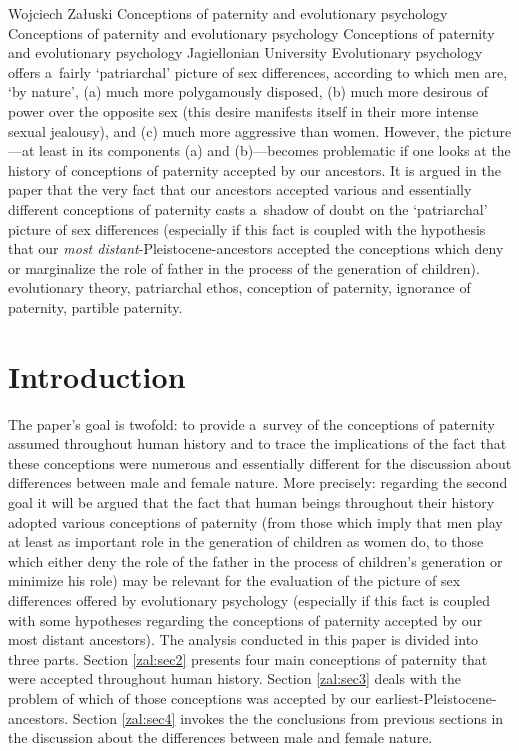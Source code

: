 \begin{artengenv}{Wojciech Załuski}
	{Conceptions of paternity and evolutionary psychology}
	{Conceptions of paternity and evolutionary psychology}
	{Conceptions of paternity and evolutionary psychology}
	{Jagiellonian University}
	{Evolutionary psychology offers a~fairly ‘patriarchal' picture of sex differences, according to which men are, ‘by nature', (a) much more polygamously disposed, (b) much more desirous of power over the opposite sex (this desire manifests itself in their more intense sexual jealousy), and (c) much more aggressive than women. However, the picture---at least in its components (a) and (b)---becomes problematic if one looks at the history of conceptions of paternity accepted by our ancestors. It is argued in the paper that the very fact that our ancestors accepted various and essentially different conceptions of paternity casts a~shadow of doubt on the ‘patriarchal' picture of sex differences (especially if this fact is coupled with the hypothesis that our \textit{most distant}-Pleistocene-ancestors accepted the conceptions which deny or marginalize the role of father in the process of the generation of children).}
	{evolutionary theory, patriarchal ethos, conception of paternity, ignorance of paternity, partible paternity.}




\section{Introduction}
\lettrine[loversize=0.13,lines=2,lraise=-0.01,nindent=0em,findent=0.2pt]%
{T}{}he paper's goal is twofold: to provide a~survey of the conceptions of paternity assumed throughout human history and to trace the implications of the fact that these conceptions were numerous and essentially different for the discussion about differences between male and female nature. More precisely: regarding the second goal it will be argued that the fact that human beings throughout their history adopted various conceptions of paternity (from those which imply that men play at least as important role in the generation of children as women do, to those which either deny the role of the father in the process of children's generation or minimize his role) may be relevant for the evaluation of the picture of sex differences offered by evolutionary psychology (especially if this fact is coupled with some hypotheses regarding the conceptions of paternity accepted by our most distant ancestors). The analysis conducted in this paper is divided into three parts. Section \ref{zal:sec2} presents four main conceptions of paternity that were accepted throughout human history. Section \ref{zal:sec3} deals with the problem of which of those conceptions was accepted by our earliest-Pleistocene-ancestors. Section \ref{zal:sec4} invokes the the conclusions from previous sections in the discussion about the differences between male and female nature.


\end{artengenv}

